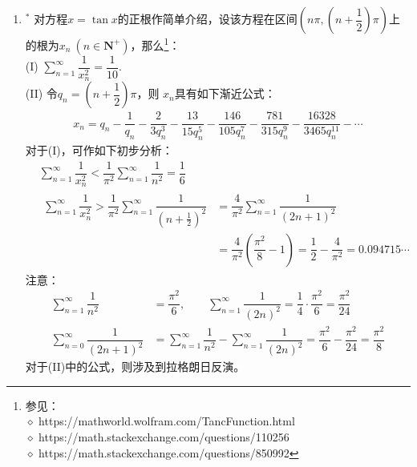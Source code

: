 \begin{enumerate}[label={【\textbf{例\thechapter.\arabic*}】},
 leftmargin=\inteval{\myenumleftmargin}pt,
 itemsep=\inteval{\myenumitempsep}pt,
 itemindent=\inteval{\myenumitemindent}pt]
因为$ f\left(\dfrac{\pi}{2}\right)=0 $，所以(II)中的不等式可以变形为
\begin{gather*}
    \dfrac{-f(x)}{\frac{\pi}{2}-x}=
    \underbrace{\dfrac{f\left(\frac{\pi}{2}\right)-f(x)}{\frac{\pi}{2}-x}}
    _{\text{割线斜率}}< \underbrace{f'(x)}_{\text{切线斜率}}
    \q \left(\frac{\pi}{4}\leq x<\frac{\pi}{2}\right)
\end{gather*}
请读者结合图形思考上式的含义。

\item $^*$ 对方程$ x=\tan x $的正根作简单介绍，设该方程在区间$ \left(n\pi,
\left(n+\dfrac{1}{2}\right)\pi\right) $上的根为$ x_n\ (n\in
\textbf{N}^+) $，那么\footnote{参见：\\
    $\diamond$ https://mathworld.wolfram.com/TancFunction.html \\
    $\diamond$ https://math.stackexchange.com/questions/110256 \\
    $\diamond$ https://math.stackexchange.com/questions/850992 }：\\
(I) $ \sum\limits_{n=1}^{\infty}\dfrac{1}{x_n^2}=
\dfrac{1}{10} $. \\
(II) 令$ q_n=\left(n+\dfrac{1}{2}\right)\pi $，则
$ x_n $具有如下渐近公式：
\begin{gather*}
    x_n=q_n-\dfrac{1}{q_n}-\dfrac{2}{3q_n^3}-\dfrac{13}{15q_n^5}
    -\dfrac{146}{105q_n^7}-\dfrac{781}{315q_n^9}
    -\dfrac{16328}{3465q_n^{11}}-\cdots
\end{gather*} 
对于(I)，可作如下初步分析：
\begin{align*}
    &\sum_{n=1}^{\infty}\dfrac{1}{x_n^2}<\dfrac{1}{\pi^2}
    \sum_{n=1}^{\infty}\dfrac{1}{n^2} =\dfrac{1}{6} \\
    &\begin{aligned}
        \sum_{n=1}^{\infty}\dfrac{1}{x_n^2}> \dfrac{1}{\pi^2}
        \sum_{n=1}^{\infty}\dfrac{1}{\left(n+\frac{1}{2}\right)^2}
        &=\dfrac{4}{\pi^2}\sum_{n=1}^{\infty}\dfrac{1}{(2n+1)^2} \\
        &=\dfrac{4}{\pi^2}\left(\dfrac{\pi^2}{8}-1\right)=
        \dfrac{1}{2}-\dfrac{4}{\pi^2}=0.094715\cdots
    \end{aligned}
\end{align*}
注意：
\begin{align*}
    \sum_{n=1}^{\infty}\dfrac{1}{n^2} &=\dfrac{\pi^2}{6},\qquad 
    \sum_{n=1}^{\infty}\dfrac{1}{(2n)^2} =
    \dfrac{1}{4}\cdot\dfrac{\pi^2}{6}=\dfrac{\pi^2}{24} \\
    \sum_{n=0}^{\infty}\dfrac{1}{(2n+1)^2} &=
    \sum_{n=1}^{\infty}\dfrac{1}{n^2}-\sum_{n=1}^{\infty}\dfrac{1}{(2n)^2}=
    \dfrac{\pi^2}{6}-\dfrac{\pi^2}{24}=\dfrac{\pi^2}{8} 
\end{align*}
对于(II)中的公式，则涉及到拉格朗日反演。


\end{enumerate}
